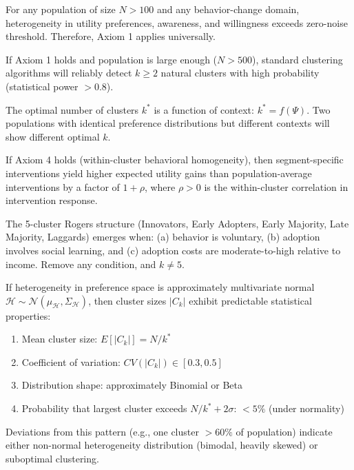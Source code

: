 \begin{proposition}
For any population of size $N > 100$ and any behavior-change domain, heterogeneity
in utility preferences, awareness, and willingness exceeds zero-noise threshold.
Therefore, Axiom 1 applies universally.
\end{proposition}

\begin{proposition}
If Axiom 1 holds and population is large enough ($N > 500$), standard clustering
algorithms will reliably detect $k \geq 2$ natural clusters with high probability
(statistical power $>0.8$).
\end{proposition}

\begin{proposition}
The optimal number of clusters $k^*$ is a function of context: $k^* = f(\Psi)$.
Two populations with identical preference distributions but different contexts
will show different optimal $k$.
\end{proposition}

\begin{proposition}
If Axiom 4 holds (within-cluster behavioral homogeneity), then segment-specific
interventions yield higher expected utility gains than population-average
interventions by a factor of $1 + \rho$, where $\rho > 0$ is the
within-cluster correlation in intervention response.
\end{proposition}

\begin{proposition}
The 5-cluster Rogers structure (Innovators, Early Adopters, Early Majority,
Late Majority, Laggards) emerges when: (a) behavior is voluntary, (b) adoption
involves social learning, and (c) adoption costs are moderate-to-high relative
to income. Remove any condition, and $k \neq 5$.
\end{proposition}

\begin{proposition}
If heterogeneity in preference space is approximately multivariate normal
$\mathcal{H} \sim \mathcal{N}(\mu_{\mathcal{H}}, \Sigma_{\mathcal{H}})$, then cluster sizes
$|C_k|$ exhibit predictable statistical properties:
\begin{enumerate}[nosep]
\item Mean cluster size: $E[|C_k|] = N/k^*$
\item Coefficient of variation: $CV(|C_k|) \in [0.3, 0.5]$
\item Distribution shape: approximately Binomial or Beta
\item Probability that largest cluster exceeds $N/k^* + 2\sigma$: $< 5\%$ (under normality)
\end{enumerate}
Deviations from this pattern (e.g., one cluster $> 60\%$ of population) indicate either
non-normal heterogeneity distribution (bimodal, heavily skewed) or suboptimal clustering.
\end{proposition}

